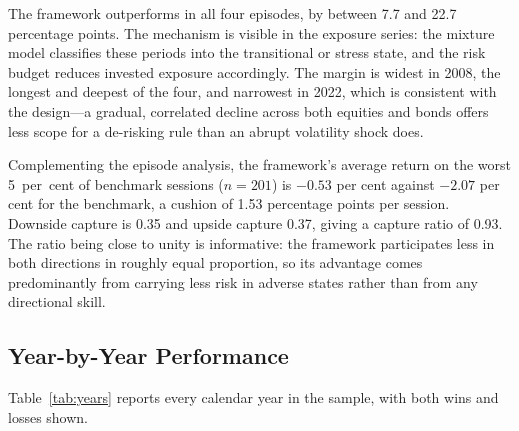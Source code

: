 The framework outperforms in all four episodes, by between 7.7 and 22.7 percentage
points. The mechanism is visible in the exposure series: the mixture model classifies
these periods into the transitional or stress state, and the risk budget reduces
invested exposure accordingly. The margin is widest in 2008, the longest and deepest of
the four, and narrowest in 2022, which is consistent with the design---a gradual,
correlated decline across both equities and bonds offers less scope for a de-risking
rule than an abrupt volatility shock does.

Complementing the episode analysis, the framework's average return on the worst
5~per~cent of benchmark sessions ($n = 201$) is $-0.53$ per cent against $-2.07$ per
cent for the benchmark, a cushion of 1.53 percentage points per session. Downside
capture is 0.35 and upside capture 0.37, giving a capture ratio of 0.93. The ratio
being close to unity is informative: the framework participates less in both directions
in roughly equal proportion, so its advantage comes predominantly from carrying less
risk in adverse states rather than from any directional skill.

\subsection{Year-by-Year Performance}

Table~\ref{tab:years} reports every calendar year in the sample, with both wins and losses shown.

